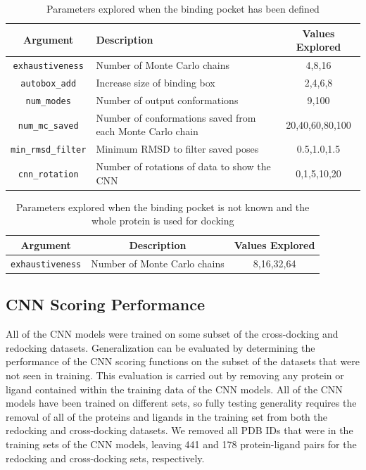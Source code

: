 \documentclass[linenumbers,doublespacing]{bmcart}
\begin{document}
\begin{table}[tbh]
    \centering
    \begin{tabular}{|c|p{}|c|}
        \hline Argument & Description & Values Explored \\ \hline
         \texttt{exhaustiveness} & Number of Monte Carlo chains & 4,8,16 \\ \hline
         \texttt{autobox\_add} & Increase size of binding box & 2,4,6,8 \\ \hline
         \texttt{num\_modes} & Number of output conformations & 9,100 \\ \hline
         \texttt{num\_mc\_saved} & Number of conformations saved from each Monte Carlo chain & 20,40,60,80,100 \\ \hline
         \texttt{min\_rmsd\_filter} & Minimum RMSD to filter saved poses & 0.5,1.0,1.5 \\ \hline
         \texttt{cnn\_rotation} & Number of rotations of data to show the CNN & 0,1,5,10,20 \\ \hline
    \end{tabular}
    \caption{Parameters explored when the binding pocket has been defined}
    \label{tab:SettingsExplPocket}
\end{table}

\begin{table}[tbh]
    \centering
    \begin{tabular}{|c|c|c|}
        \hline Argument & Description & Values Explored \\ \hline
         \texttt{exhaustiveness} & Number of Monte Carlo chains & 8,16,32,64 \\ \hline
    \end{tabular}
    \caption{Parameters explored when the binding pocket is not known and the whole protein is used for docking}
    \label{tab:SettingsExplWP}
\end{table}

\subsection{CNN Scoring Performance}
All of the CNN models were trained on some subset of the cross-docking and redocking datasets. Generalization can be evaluated by determining the performance of the CNN scoring functions on the subset of the datasets that were not seen in training. This evaluation is carried out by removing any protein or ligand contained within the training data of the CNN models. All of the CNN models have been trained on different sets, so fully testing generality requires the removal of all of the proteins and ligands in the training set from both the redocking and cross-docking datasets. We removed all PDB IDs that were in the training sets of the CNN models\cite{liu2017forging,francoeur2020three}, leaving 441 and 178 protein-ligand pairs for the redocking and cross-docking sets, respectively.
\end{document}
